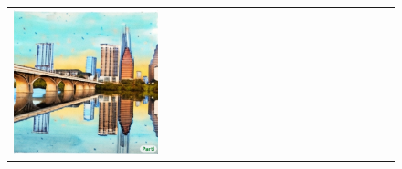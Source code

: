 \begin{figure}[ht!]
\begin{adjustwidth}{-0.8in}{-0.5in}
\begin{tabular}{cccccccccccccccccccc}
\multicolumn{2}{c}{\includegraphics[width=\threebythreecolwidth\textwidth]{figures/cherries/ink_6_austin.jpg}} \\


\end{tabular}
\end{adjustwidth}
\end{figure}
